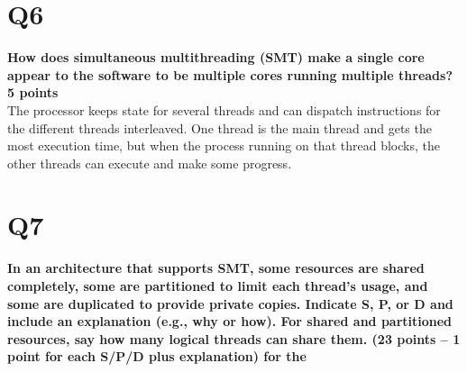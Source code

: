 \documentclass[a4paper]{article}
\begin{document}
\section*{Q6}
\large{\textbf{
How does simultaneous multithreading (SMT) make a single core appear to the software to be multiple cores running multiple threads? 5 points\\}}
The processor keeps state for several threads and can dispatch instructions for the different threads interleaved. One thread is the main thread and gets the most execution time, but when the process running on that thread blocks, the other threads can execute and make some progress.

\section*{Q7}
\large{\textbf{
In an architecture that supports SMT, some resources are shared completely, some are partitioned to limit each thread’s usage, and some are duplicated to provide private copies. Indicate S, P, or D and include an explanation (e.g., why or how). For shared and partitioned resources, say how many logical threads can share them. (23 points -- 1 point for each S/P/D plus explanation) for the \\}}
\end{document}
